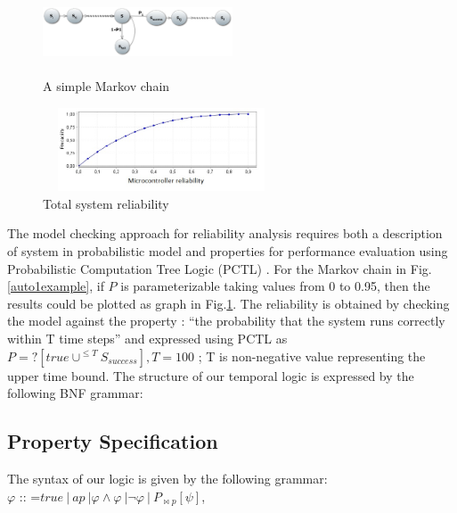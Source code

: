 \documentclass[3p,times,procedia,authoryear,round]{elsarticle}
\begin{document}
\begin{figure}[!htb]
    \centering
    \begin{minipage}{.5\textwidth}
        \centering
        \includegraphics[width=160pt, height =50pt]{dtmcexample.jpg}
        \caption{A simple Markov chain}
        \label{auto1example}
    \end{minipage}%
    \begin{minipage}{0.5\textwidth}
        \centering
        \includegraphics[width=200pt, height =70pt]{reliabilityExp.jpg}
        \caption{Total system reliability}
        \label{auto1examplegraph}
    \end{minipage}
\end{figure}

The model checking approach for reliability analysis requires both a description of system in probabilistic model and properties for performance evaluation using Probabilistic Computation Tree Logic (PCTL) \citep{Kwiatkowska2002}. For the Markov chain in Fig. \ref{auto1example}, if $P$ is parameterizable taking values from 0 to 0.95, then the results could be plotted as graph in Fig.\ref{auto1examplegraph}. The reliability is obtained by checking the model against the property : ``the probability that the system runs correctly within T time steps'' and expressed using PCTL as $P=?[true \cup^{\leq T} S_{success} ], T=100$ ; T is non-negative value representing the upper time bound.  The structure of our temporal logic is expressed by the following BNF grammar:

\subsection{Property Specification}
The syntax of our logic is given by the following grammar:\\

$\varphi$ :: =$ true \ |\ ap \ | \varphi \wedge \varphi \ | \neg  \varphi \  |\  P _{ \bowtie p } [ \psi ]  $,  \\
\end{document}
